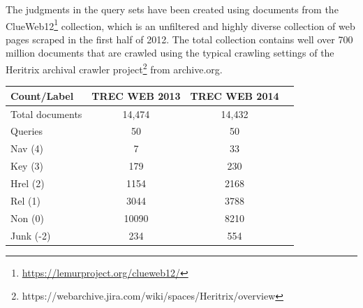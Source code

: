 The judgments in the query sets have been created using documents from the  ClueWeb12\footnote{\url{https://lemurproject.org/clueweb12/}} collection, which is an unfiltered and highly diverse collection of web pages scraped in the first half of 2012. The total collection contains well over 700 million documents that are crawled using the typical crawling settings of the Heritrix archival crawler project\footnote{https://webarchive.jira.com/wiki/spaces/Heritrix/overview} from archive.org.  

\begin{center}
  \begin{tabular}{ l | c | c | c }
    Count/Label & TREC WEB 2013 & TREC WEB 2014 \\
    \hline
    Total documents & 14,474 & 14,432 \\
    Queries & 50 & 50 \\
    Nav (4) & 7 & 33 \\
    Key (3) & 179 & 230 \\
    Hrel (2) & 1154 & 2168 \\
    Rel (1) & 3044 & 3788 \\
    Non (0) & 10090 & 8210 \\
    Junk (-2) & 234 & 554 \\
    \hline
  \end{tabular}
   \label{tab:webstats} 
\end{center}

